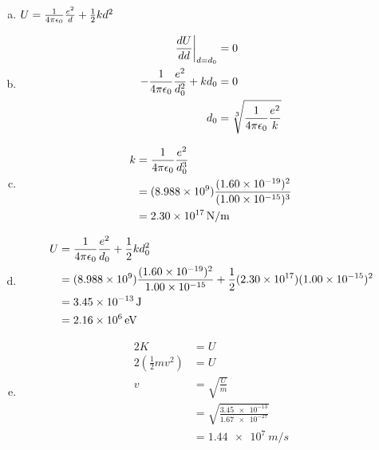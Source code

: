\documentclass{article}
\begin{document}
\begin{enumerate}[a)]
  \item $U = \frac{1}{4 \pi \epsilon_0} \frac{e^2}{d} + \frac{1}{2} k d^2$

  \item

        \begin{align*}
          \left. \frac{dU}{dd} \right|_{d = d_0} & = 0                           \\
          -\frac{1}{4 \pi \epsilon_0} \frac{e^2}{d_0^2} + k d_0         & = 0                           \\
          d_0                                    & = \sqrt[3]{\frac{1}{4 \pi \epsilon_0} \frac{e^2}{k}}
        \end{align*}

  \item

        \begin{align*}
          k & = \frac{1}{4 \pi \epsilon_0} \frac{e^2}{d_0^3}                                         \\
            & = (\num{8.988e9}) \frac{(\num{1.60e-19})^2}{(\num{1.00e-15})^3} \\
            & = \qty{2.30e17}{N/m}
        \end{align*}

  \item

        \begin{align*}
          U & = \frac{1}{4 \pi \epsilon_0} \frac{e^2}{d_0} + \frac{1}{2} k d_0^2                                                                  \\
            & = (\num{8.988e9}) \frac{(\num{1.60e-19})^2}{\num{1.00e-15}} + \frac{1}{2} (\num{2.30e17}) (\num{1.00e-15})^2 \\
            & = \qty{3.45e-13}{J}                                                                                          \\
            & = \qty{2.16e6}{eV}
        \end{align*}

  \item

        \begin{align*}
          2 K                                & = U                                            \\
          2 \left( \frac{1}{2} m v^2 \right) & = U                                            \\
          v                                  & = \sqrt{\frac{U}{m}}                           \\
                                             & = \sqrt{\frac{\num{3.45e-13}}{\num{1.67e-27}}} \\
                                             & = \qty{1.44e7}{m/s}
        \end{align*}
\end{enumerate}
\end{document}
